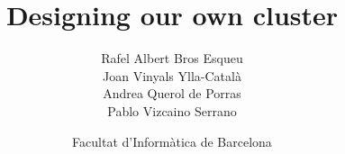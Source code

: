\documentclass[aspectratio=43]{beamer}
\title[PAP]{Designing our own cluster} %
\author{Rafel Albert Bros Esqueu \\ Joan Vinyals Ylla-Català \\ Andrea Querol de Porras \\ Pablo Vizcaino Serrano} %
\institute[FIB] %
{
Programació i Arquitectures Paral·leles
}
\date{Facultat d'Informàtica de Barcelona} %
\begin{document}
\begin{frame}
\titlepage %
\end{frame}


\begin{frame}
\titlepage
\end{frame}
\end{document}

